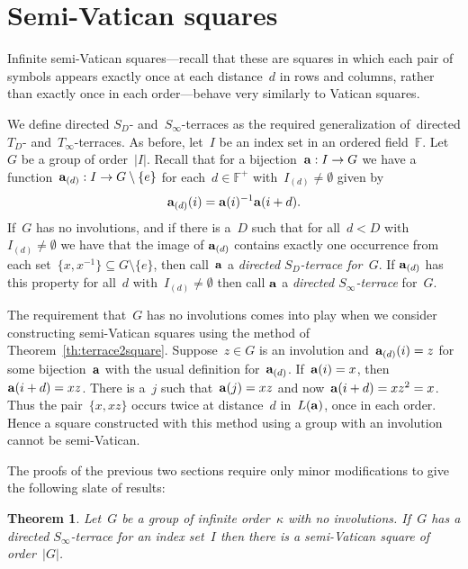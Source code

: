 \documentclass[12pt,a4paper]{article}
\newtheorem{thm}{Theorem}[section]
\newcommand{\F}{\mathbb{F}}
\begin{document}
\section{Semi-Vatican squares}\label{sec:semivat}

Infinite semi-Vatican squares---recall that these are squares in which each pair of symbols appears exactly once at each distance~$d$ in rows and columns, rather than exactly once in each order---behave very similarly to Vatican squares.  

We define directed $S_{D}$- and~$S_{\infty}$-terraces as the required generalization of~directed $T_{D}$- and~$T_{\infty}$-terraces.  As before, let~$I$ be an index set in an ordered field~$\F$.  Let~$G$ be a group of order~$|I|$.  Recall that for a bijection~${\bf a}: I \rightarrow G$ we have a function~${\bf a}_{(d)}: I \rightarrow G \setminus \{ e \}$ for each~$d \in \F^+$ with~$I_{(d)} \neq \emptyset$ given by
$${\bf a}_{(d)}(i) = {\bf a}(i)^{-1}{\bf a}(i+d).$$
If~$G$ has no involutions, and if there is a~$D$ such that for all~$d < D$ with~$I_{(d)} \neq \emptyset$ we have that the image of ${\bf a}_{(d)}$ contains exactly one occurrence from each set~$\{ x,x^{-1} \} \subseteq G\setminus \{e\}$, then call~${\bf a}$ a {\em directed $S_D$-terrace for~$G$}.  If ${\bf a}_{(d)}$ has this property for all~$d$ with~$I_{(d)} \neq \emptyset$ then call ${\bf a}$  a {\em directed $S_{\infty}$-terrace} for~$G$.

The requirement that~$G$ has no involutions comes into play when we consider constructing semi-Vatican squares using the method of Theorem~\ref{th:terrace2square}.  Suppose~$z \in G$ is an involution and~${\bf a}_{(d)}(i) = z$ for some bijection~${\bf a}$ with the usual definition for~${\bf a}_{(d)}$.  If~${\bf a}(i) = x$, then ${\bf a}(i+d) = xz$.  There is a~$j$ such that~${\bf a}(j) = xz$ and now~${\bf a}(i+d) = xz^2 = x$.  Thus the pair~$\{ x, xz \}$ occurs twice at distance~$d$ in~$L({\bf a})$, once in each order.  Hence a square constructed with this method using a group with an involution cannot be semi-Vatican.



The proofs of the previous two sections require only minor modifications to give the following slate of results:

\begin{thm}\label{th:semi_terrace2square}
Let~$G$ be a group of infinite order~$\kappa$ with no involutions.  If~$G$ has a directed $S_{\infty}$-terrace for an index set~$I$ then there is a semi-Vatican square of order~$|G|$.
\end{thm}
\end{document}
